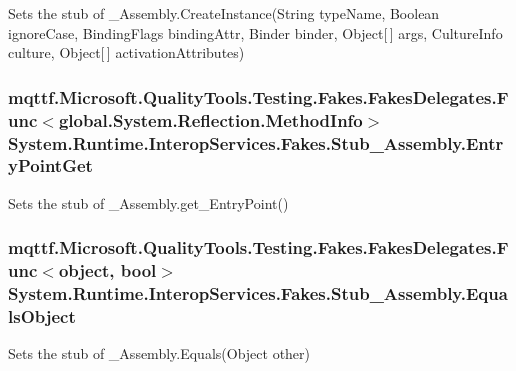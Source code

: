 Sets the stub of \-\_\-\-Assembly.\-Create\-Instance(\-String type\-Name, Boolean ignore\-Case, Binding\-Flags binding\-Attr, Binder binder, Object\mbox{[}$\,$\mbox{]} args, Culture\-Info culture, Object\mbox{[}$\,$\mbox{]} activation\-Attributes)

\hypertarget{class_system_1_1_runtime_1_1_interop_services_1_1_fakes_1_1_stub___assembly_a479a2c03221628d89ad318ba388f676f}{
\subsubsection[{Entry\-Point\-Get}]{\setlength{\rightskip}{0pt plus 5cm}mqttf.\-Microsoft.\-Quality\-Tools.\-Testing.\-Fakes.\-Fakes\-Delegates.\-Func$<$global.\-System.\-Reflection.\-Method\-Info$>$ System.\-Runtime.\-Interop\-Services.\-Fakes.\-Stub\-\_\-\-Assembly.\-Entry\-Point\-Get}}\label{class_system_1_1_runtime_1_1_interop_services_1_1_fakes_1_1_stub___assembly_a479a2c03221628d89ad318ba388f676f}


Sets the stub of \-\_\-\-Assembly.\-get\-\_\-\-Entry\-Point()

\hypertarget{class_system_1_1_runtime_1_1_interop_services_1_1_fakes_1_1_stub___assembly_a626666fc2360394899fe1398f7d80d11}{
\subsubsection[{Equals\-Object}]{\setlength{\rightskip}{0pt plus 5cm}mqttf.\-Microsoft.\-Quality\-Tools.\-Testing.\-Fakes.\-Fakes\-Delegates.\-Func$<$object, bool$>$ System.\-Runtime.\-Interop\-Services.\-Fakes.\-Stub\-\_\-\-Assembly.\-Equals\-Object}}\label{class_system_1_1_runtime_1_1_interop_services_1_1_fakes_1_1_stub___assembly_a626666fc2360394899fe1398f7d80d11}


Sets the stub of \-\_\-\-Assembly.\-Equals(\-Object other)

